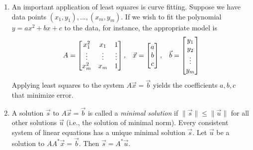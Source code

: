 \documentclass[10pt]{article}
\begin{document}
\begin{multicols*}{2}
\begin{enumerate}
\begin{enumerate}
        \item An important application of least squares is curve fitting. Suppose we have data points $(x_1, y_1), \hdots, (x_m, y_m)$. If we wish to fit the polynomial $y=ax^2 + bx + c$ to the data, for instance, the appropriate model is
        \begin{align*}
            A = 
            \begin{bmatrix} 
            x_1^2 & x_1 & 1 \\
            \vdots & \vdots & \vdots \\
            x_m^2 & x_m & 1
            \end{bmatrix}, \hspace{3mm}
            \vec{x} = 
            \begin{bmatrix}
            a \\ b \\ c
            \end{bmatrix}, \hspace{3mm}
            \vec{b} = 
            \begin{bmatrix}
            y_1 \\ y_2 \\ \vdots \\ y_m
            \end{bmatrix}
        \end{align*}
        Applying least squares to the system $A\vec{x}=\vec{b}$ yields the coefficients $a,b,c$ that minimize error.
        
        \item A solution $\vec{s}$ to $A\vec{x} = \vec{b}$ is called a \textit{minimal solution} if $\|\vec{s}\| \leq \| \vec{u} \|$ for all other solutions $\vec{u}$ (i.e., the solution of minimal norm). Every consistent system of linear equations has a unique minimal solution $\vec{s}$. Let $\vec{u}$ be a solution to $AA^*\vec{x} = \vec{b}$. Then $\vec{s} = A^*\vec{u}$.
    \end{enumerate}
    

\end{enumerate}
\end{multicols*}
\end{document}
